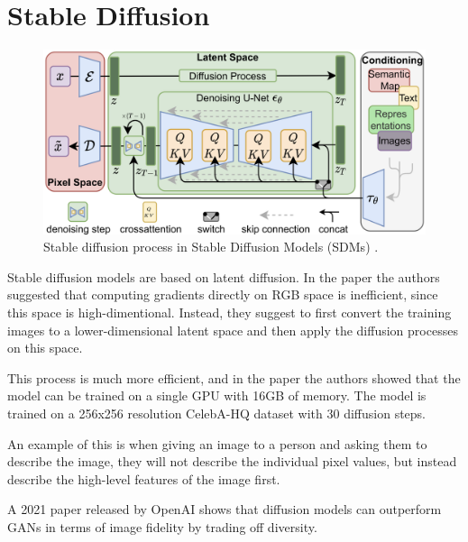 \section{Stable Diffusion}
\label{sec:stable_diffusion}

\begin{figure}
    \centering
    \includegraphics[width=1\textwidth]{images/diffusion_models/stable_diffusion.png}
    \caption{Stable diffusion process in Stable Diffusion Models (SDMs) \cite{stable_diffusion}.}
    \label{fig:stable_diffusion}
\end{figure}

Stable diffusion models are based on latent diffusion. In the paper \cite{stable_diffusion} the authors suggested that computing gradients directly on RGB space is inefficient, since this space is high-dimentional. Instead, they suggest to first convert the training images to a lower-dimensional latent space and then apply the diffusion processes on this space.

This process is much more efficient, and in the paper \cite{stable_diffusion} the authors showed that the model can be trained on a single GPU with 16GB of memory. The model is trained on a 256x256 resolution CelebA-HQ dataset with 30 diffusion steps.

An example of this is when giving an image to a person and asking them to describe the image, they will not describe the individual pixel values, but instead describe the high-level features of the image first.

A 2021 paper released by OpenAI \cite{openai_diffusion_beats_gans} shows that diffusion models can outperform GANs in terms of image fidelity by trading off diversity.